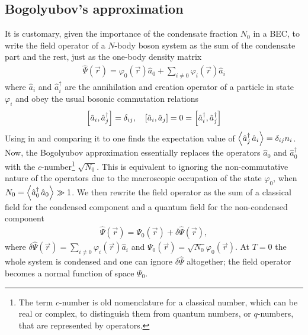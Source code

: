 		\subsection{Bogolyubov's approximation}\label{sec:bogol-order}
			It is customary, given the importance of the condensate fraction $N_0$ in a BEC, to write the field operator of a $N$-body boson system as the sum of the condensate part and the rest, just as the one-body density matrix
			\begin{align}
				\hat{\Psi}(\vec{r})=\varphi_0(\vec{r})\hat{a}_0 + \sum_{i\neq 0} \varphi_i(\vec{r})\hat{a}_i \label{eq:field-operator}
			\end{align}
			where $\hat{a}_i$ and $\hat{a}_i^\dagger$ are the annihilation and creation operator of a particle in state $\varphi_i$ and obey the usual bosonic commutation relations
			\begin{align}
				\commutator{\hat{a}_i}{\hat{a}_j^\dagger}=\delta_{ij},\quad 	\commutator{\hat{a}_i}{\hat{a}_j}=0=\commutator{\hat{a}_i^\dagger}{\hat{a}_j^\dagger}
			\end{align}
			Using  in  and comparing it to  one finds the expectation value of $\expectationvalue{\hat{a}_j^\dagger\,\hat{a}_i}=\delta_{ij}n_i$. Now, the Bogolyubov approximation essentially replaces the operators $\hat{a}_0$ and $\hat{a}_0^\dagger$ with the $c$-number\footnote{The term $c$-number is old nomenclature for a classical number, which can be real or complex, to distinguish them from quantum numbers, or $q$-numbers, that are represented by operators.} $\sqrt{N_0}$. This is equivalent to ignoring the non-commutative nature of the operators due to the macroscopic occupation of the state $\varphi_0$, when $N_0=\expectationvalue{\hat{a}_0^\dagger\,\hat{a}_0}\gg 1$. We then rewrite the field operator as the sum of a classical field for the condensed component and a quantum field for the non-condensed component
			\begin{align}
				\hat{\Psi}(\vec{r})=\Psi_0(\vec{r})+\delta\hat{\Psi}(\vec{r}),\label{eq:order-param-real}
			\end{align}
			where $\delta\hat{\Psi}(\vec{r})=\sum_{i\neq 0}\varphi_i(\vec{r})\hat{a}_i$ and $\Psi_0(\vec{r})=\sqrt{N_0}\varphi_0(\vec{r})$. At $T=0$ the whole system is condensed and one can ignore $\delta\hat{\Psi}$ altogether; the field operator becomes a normal function of space $\Psi_0$.
			
